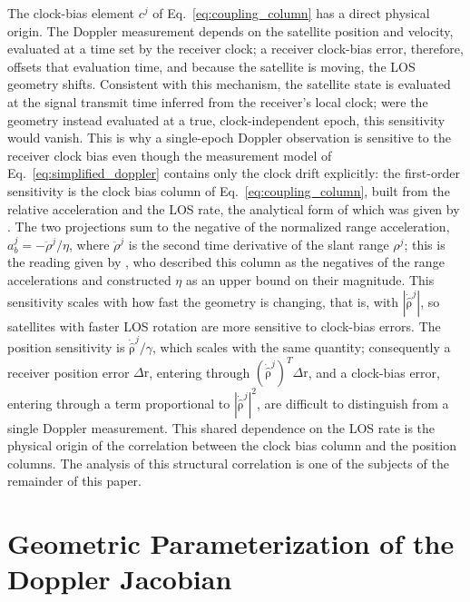 \documentclass[letterpaper,times]{IONconf-v2}
\theoremstyle{plain}
\theoremstyle{remark}
\renewcommand{\vec}[1]{{\boldsymbol{\mathrm{#1}}}}
\begin{document}
The clock-bias element $c^j$ of Eq.~\eqref{eq:coupling_column} has a direct physical origin. The Doppler measurement depends on the satellite position and velocity, evaluated at a time set by the receiver clock; a receiver clock-bias error, therefore, offsets that evaluation time, and because the satellite is moving, the LOS geometry shifts. Consistent with this mechanism, the satellite state is evaluated at the signal transmit time inferred from the receiver's local clock; were the geometry instead evaluated at a true, clock-independent epoch, this sensitivity would vanish. This is why a single-epoch Doppler observation is sensitive to the receiver clock bias even though the measurement model of Eq.~\eqref{eq:simplified_doppler} contains only the clock drift explicitly: the first-order sensitivity is the clock bias column of Eq.~\eqref{eq:coupling_column}, built from the relative acceleration and the LOS rate, the analytical form of which was given by \textcite{Psiaki2021}. The two projections sum to the negative of the normalized range acceleration, $a_b^j = -\ddot{\rho}^j/\eta$, where $\ddot{\rho}^j$ is the second time derivative of the slant range $\rho^j$; this is the reading given by \textcite{Psiaki2021}, who described this column as the negatives of the range accelerations and constructed $\eta$ as an upper bound on their magnitude. This sensitivity scales with how fast the geometry is changing, that is, with $|\dot{\hat{\vec\rho}}^j|$, so satellites with faster LOS rotation are more sensitive to clock-bias errors. The position sensitivity is $\dot{\hat{\vec\rho}}^j/\gamma$, which scales with the same quantity; consequently a receiver position error $\Delta\vec{r}$, entering through $(\dot{\hat{\vec\rho}}^j)^T\Delta\vec{r}$, and a clock-bias error, entering through a term proportional to $|\dot{\hat{\vec\rho}}^j|^2$, are difficult to distinguish from a single Doppler measurement. This shared dependence on the LOS rate is the physical origin of the correlation between the clock bias column and the position columns. The analysis of this structural correlation is one of the subjects of the remainder of this paper.

\vspace{-10pt}

\section{Geometric Parameterization of the Doppler Jacobian}\label{sec:parameterization}

\vspace{-5pt}
\end{document}
